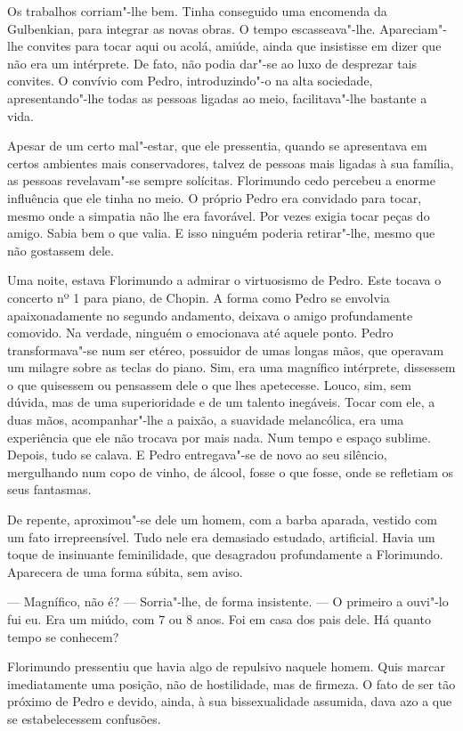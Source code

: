 Os trabalhos corriam"-lhe bem. Tinha conseguido uma encomenda da
Gulbenkian, para integrar as novas obras. O tempo escasseava"-lhe.
Apareciam"-lhe convites para tocar aqui ou acolá, amiúde, ainda que
insistisse em dizer que não era um intérprete. De fato, não podia
dar"-se ao luxo de desprezar tais convites. O convívio com Pedro,
introduzindo"-o na alta sociedade, apresentando"-lhe todas as pessoas
ligadas ao meio, facilitava"-lhe bastante a vida.

Apesar de um certo mal"-estar, que ele pressentia, quando se apresentava
em certos ambientes mais conservadores, talvez de pessoas mais ligadas à
sua família, as pessoas revelavam"-se sempre solícitas. Florimundo cedo
percebeu a enorme influência que ele tinha no meio. O próprio Pedro era
convidado para tocar, mesmo onde a simpatia não lhe era favorável. Por
vezes exigia tocar peças do amigo. Sabia bem o que valia. E isso ninguém
poderia retirar"-lhe, mesmo que não gostassem dele.

Uma noite, estava Florimundo a admirar o virtuosismo de Pedro. Este
tocava o concerto nº 1 para piano, de Chopin. A forma como Pedro se
envolvia apaixonadamente no segundo andamento, deixava o amigo
profundamente comovido. Na verdade, ninguém o emocionava até aquele
ponto. Pedro transformava"-se num ser etéreo, possuidor de umas longas
mãos, que operavam um milagre sobre as teclas do piano. Sim, era uma
magnífico intérprete, dissessem o que quisessem ou pensassem dele o que
lhes apetecesse. Louco, sim, sem dúvida, mas de uma superioridade e de
um talento inegáveis. Tocar com ele, a duas mãos, acompanhar"-lhe a
paixão, a suavidade melancólica, era uma experiência que ele não trocava
por mais nada. Num tempo e espaço sublime. Depois, tudo se calava. E
Pedro entregava"-se de novo ao seu silêncio, mergulhando num copo de
vinho, de álcool, fosse o que fosse, onde se refletiam os seus
fantasmas.

De repente, aproximou"-se dele um homem, com a barba aparada, vestido com
um fato irrepreensível. Tudo nele era demasiado estudado, artificial.
Havia um toque de insinuante feminilidade, que desagradou profundamente
a Florimundo. Aparecera de uma forma súbita, sem aviso.

--- Magnífico, não é? --- Sorria"-lhe, de forma insistente. --- O primeiro a
ouvi"-lo fui eu. Era um miúdo, com 7 ou 8 anos. Foi em casa dos pais
dele. Há quanto tempo se conhecem?

Florimundo pressentiu que havia algo de repulsivo naquele homem. Quis
marcar imediatamente uma posição, não de hostilidade, mas de firmeza. O
fato de ser tão próximo de Pedro e devido, ainda, à sua bissexualidade
assumida, dava azo a que se estabelecessem confusões.

